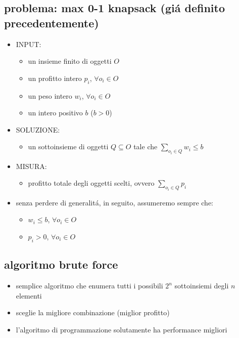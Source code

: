 
\subsection*{problema: max 0-1 knapsack (gi\'a definito precedentemente)}
\begin{flushleft}
	\begin{itemize}
		\item INPUT:
		\begin{itemize}
			\item un insieme finito di oggetti $O$
			\item un profitto intero $p_i$, $\forall o_i\in O$
			\item un peso intero $w_i$, $\forall o_i\in O$
			\item un intero positivo $b$ ($b>0$)
		\end{itemize}
		\item SOLUZIONE:
		\begin{itemize}
			\item un sottoinsieme di oggetti $Q\subseteq O$ tale che $\sum_{o_i\in Q}w_i\leq b$
		\end{itemize}
		\item MISURA:
		\begin{itemize}
			\item profitto totale degli oggetti scelti, ovvero $\sum_{o_i\in Q}p_i$
		\end{itemize}
		\vspace{0.5cm}
		\item senza perdere di generalit\'a, in seguito, assumeremo sempre che:
		\begin{itemize}
			\item $w_i\leq b$, $\forall o_i\in O$
			\item $p_i>0$, $\forall o_i\in O$
		\end{itemize}
	\end{itemize}
\end{flushleft}


\subsection*{algoritmo brute force}
\begin{flushleft}
	\begin{itemize}
		\item semplice algoritmo che enumera tutti i possibili $2^n$ sottoinsiemi degli $n$ elementi
		\item sceglie la migliore combinazione (miglior profitto)
		\item l'algoritmo di programmazione solutamente ha performance migliori
	\end{itemize}
\end{flushleft}


